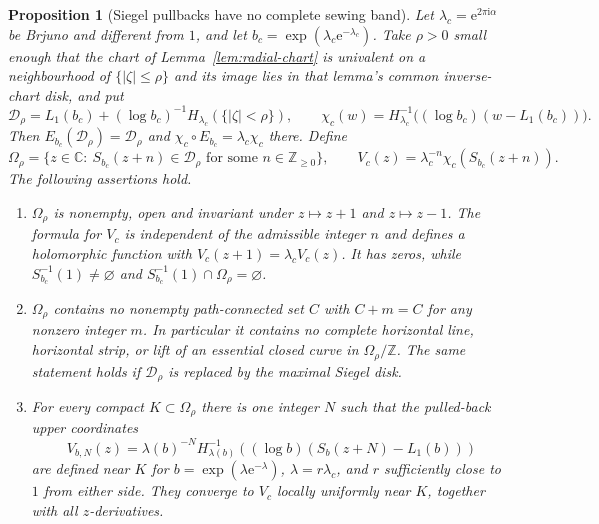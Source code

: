 \documentclass[11pt,a4paper]{article}
\newtheorem{proposition}[theorem]{Proposition}
\theoremstyle{definition}
\newcommand{\eee}{\mathrm{e}}
\newcommand{\ii}{\mathrm{i}}
\begin{document}
\begin{proposition}[Siegel pullbacks have no complete sewing band]
\label{prop:siegel-pullback}
Let $\lambda_c=\eee^{2\pi\ii\alpha}$ be Brjuno and different from $1$,
and let $b_c=\exp(\lambda_c\eee^{-\lambda_c})$.  Take $\rho>0$ small enough
that the chart of Lemma~\ref{lem:radial-chart} is univalent on a
neighbourhood of $\{|\zeta|\le\rho\}$ and its image lies in that
lemma's common inverse-chart disk, and put
\[
 \mathcal D_\rho=
 L_1(b_c)+(\log b_c)^{-1}H_{\lambda_c}(\{|\zeta|<\rho\}),
 \qquad
 \chi_c(w)=H_{\lambda_c}^{-1}
       \bigl((\log b_c)(w-L_1(b_c))\bigr).
\]
Then $E_{b_c}(\mathcal D_\rho)=\mathcal D_\rho$ and
$\chi_c\circ E_{b_c}=\lambda_c\chi_c$ there.  Define
\[
 \Omega_\rho=
 \bigl\{z\in\mathbb C:\ S_{b_c}(z+n)\in\mathcal D_\rho
                         \text{ for some }n\in\mathbb Z_{\ge0}\bigr\},\qquad
 V_c(z)=\lambda_c^{-n}\chi_c(S_{b_c}(z+n)).
\]
The following assertions hold.
\begin{enumerate}
\item $\Omega_\rho$ is nonempty, open and invariant under $z\mapsto z+1$ and
  $z\mapsto z-1$.  The formula for $V_c$ is independent of the admissible
  integer $n$ and defines a holomorphic function with
  $V_c(z+1)=\lambda_c V_c(z)$.  It has zeros, while
  $S_{b_c}^{-1}(1)\ne\varnothing$ and
  $S_{b_c}^{-1}(1)\cap\Omega_\rho=\varnothing$.
\item $\Omega_\rho$ contains no nonempty path-connected set $C$ with
  $C+m=C$ for any nonzero integer $m$.  In particular it contains no complete horizontal line,
  horizontal strip, or lift of an essential closed curve in
  $\Omega_\rho/\mathbb Z$.  The same statement holds if
  $\mathcal D_\rho$ is replaced by the maximal Siegel disk.
\item For every compact $K\subset\Omega_\rho$ there is one integer $N$
  such that the pulled-back upper coordinates
  \[
   V_{b,N}(z)=\lambda(b)^{-N}
      H_{\lambda(b)}^{-1}\!\left(
        (\log b)(S_b(z+N)-L_1(b))\right)
  \]
  are defined near $K$ for $b=\exp(\lambda\eee^{-\lambda})$,
  $\lambda=r\lambda_c$, and $r$ sufficiently close to $1$ from either
  side.  They converge to $V_c$ locally uniformly near $K$, together
  with all $z$-derivatives.
\end{enumerate}
\end{proposition}
\end{document}
